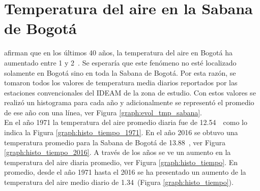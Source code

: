 





\section{Temperatura del aire en la Sabana de Bogotá} %
%
\citet{Ruiz2012} afirman que en los últimos 40 años, la temperatura del aire en Bogotá ha aumentado entre 1 y 2\celc \ . Se esperaría que este fenómeno no esté localizado solamente en Bogotá sino en toda la Sabana de Bogotá. Por esta razón, se tomaron todos los valores de temperatura media diarios reportados por las estaciones convencionales del IDEAM de la zona de estudio. Con estos valores se realizó un histograma para cada año y adicionalmente se representó el promedio de ese año con una línea, ver Figura \ref{graph:evol_tmp_sabana}.\\

En el año 1971 la temperatura del aire promedio diaria fue de 12.54\celc \  \ como lo indica la Figura \ref{graph:histo_tiempo_1971}. En el año 2016 se obtuvo una temperatura promedio para la Sabana de Bogotá de 13.88\celc \ , ver Figura \ref{graph:histo_tiempo_2016}. A través de los años se ve un aumento en la temperatura del aire diaria promedio, ver Figura \ref{graph:histo_tiempo}. En promedio, desde el año 1971 hasta el 2016 se ha presentado un aumento de la temperatura del aire medio diario de 1.34\celc \  (Figura \ref{graph:histo_tiempo}).\\


